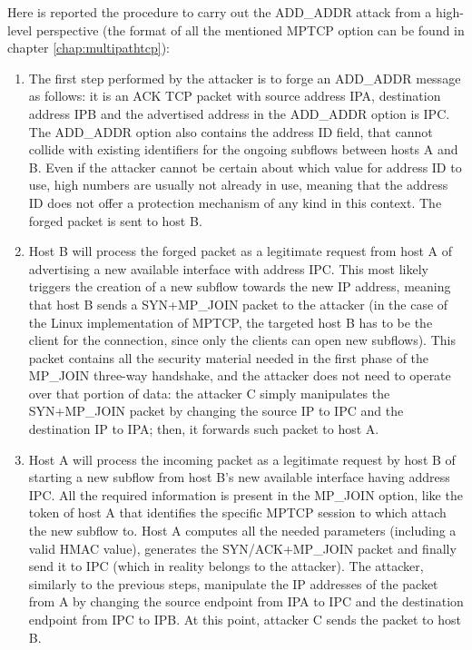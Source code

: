 Here is reported the procedure to carry out the ADD\_ADDR attack from a high-level perspective (the format of all the mentioned MPTCP option can be found in chapter \ref{chap:multipathtcp}):


\begin{enumerate}  
\item  The first step performed by the attacker is to forge an ADD\_ADDR message as follows: it is an ACK TCP packet with source address IPA, destination address IPB and the advertised address in the ADD\_ADDR option is IPC. The ADD\_ADDR option also contains the address ID field, that cannot collide with existing identifiers for the ongoing subflows between hosts A and B. Even if the attacker cannot be certain about which value for address ID to use, high numbers are usually not already in use, meaning that the address ID does not offer a protection mechanism of any kind in this context.
The forged packet is sent to host B.

\item Host B will process the forged packet as a legitimate request from host A of advertising a new available interface with address IPC. This most likely triggers the creation of a new subflow towards the new IP address, meaning that host B sends a SYN+MP\_JOIN packet to the attacker (in the case of the Linux implementation of MPTCP, the targeted host B has to be the client for the connection, since only the clients can open new subflows). This packet contains all the security material needed in the first phase of the MP\_JOIN three-way handshake, and the attacker does not need to operate over that portion of data: the attacker C simply manipulates the SYN+MP\_JOIN packet by changing the source IP to IPC and the destination IP to IPA; then, it forwards such packet to host A.

\item Host A will process the incoming packet as a legitimate request by host B of starting a new subflow from host B's new available interface having address IPC. All the required information is present in the MP\_JOIN option, like the token of host A that identifies the specific MPTCP session to which attach the new subflow to. Host A computes all the needed parameters (including a valid HMAC value), generates the SYN/ACK+MP\_JOIN packet and finally send it to IPC (which in reality belongs to the attacker). The attacker, similarly to the previous steps, manipulate the IP addresses of the packet from A by changing the source endpoint from IPA to IPC and the destination endpoint from IPC to IPB. At this point, attacker C sends the packet to host B.


\end{enumerate}
